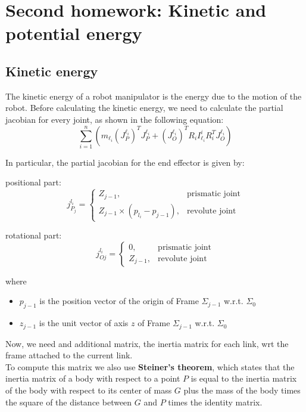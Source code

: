 \documentclass{article}
\begin{document}
\section{Second homework: Kinetic and potential energy}
\justify
\subsection{Kinetic energy}
The kinetic energy of a robot manipulator is the energy due to the motion of the robot.
Before calculating the kinetic energy, we need to calculate the partial jacobian for every joint, as shown in the following equation:
\begin{equation}
    \sum_{i=1}^{n} \left( m_{\ell_i} \left( J_P^{\ell_i} \right)^T J_P^{\ell_i} + \left( J_O^{\ell_i} \right)^T R_i I_{\ell_i}^i R_i^T J_O^{\ell_i} \right)
\end{equation}

In particular, the partial jacobian for the end effector is given by:

positional part:
\begin{equation}
    j_{P_j}^{l_i} =
    \begin{cases}
        Z_{j-1},                            & \text{prismatic joint} \\
        Z_{j-1} \times (p_{l_i} - p_{j-1}), & \text{revolute joint}
    \end{cases}
\end{equation}

rotational part:
\begin{equation}
    j_{Oj}^{l_i} =
    \begin{cases}
        0,       & \text{prismatic joint} \\
        Z_{j-1}, & \text{revolute joint}
    \end{cases}
\end{equation}


where
\begin{itemize}
    \item $p_{j-1}$ is the position vector of the origin of Frame $\Sigma_{j-1}$ w.r.t. $\Sigma_0$
    \item $z_{j-1}$ is the unit vector of axis $z$ of Frame $\Sigma_{j-1}$ w.r.t. $\Sigma_0$
\end{itemize}

Now, we need and additional matrix, the inertia matrix for each link, wrt the frame attached to the current link. \\
To compute this matrix we also use \textbf{Steiner's theorem}, which states that the inertia matrix of a body with respect to a point $P$ is equal to the inertia matrix of the body with respect to its center of mass $G$
plus the mass of the body times the square of the distance between $G$ and $P$ times the identity matrix.
\end{document}
